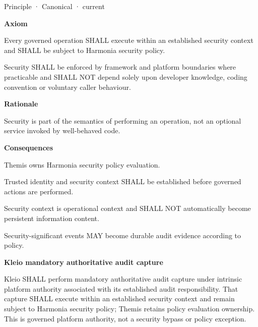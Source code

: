 \label{element:5de2ae2c3b794c2d9f3a14efd51d564f}
{\small Principle · Canonical · current}\par

\par\medskip\textbf{Axiom}\par


Every governed operation SHALL execute within an established security
context and SHALL be subject to Harmonia security policy.



Security SHALL be enforced by framework and platform boundaries where
practicable and SHALL NOT depend solely upon developer knowledge, coding
convention or voluntary caller behaviour.



\par\medskip\textbf{Rationale}\par


Security is part of the semantics of performing an operation, not an
optional service invoked by well-behaved code.



\par\medskip\textbf{Consequences}\par


Themis owns Harmonia security policy evaluation.



Trusted identity and security context SHALL be established before
governed actions are performed.



Security context is operational context and SHALL NOT automatically
become persistent information content.



Security-significant events MAY become durable audit evidence according
to policy.







\par\medskip\textbf{Kleio mandatory authoritative audit capture}\par


Kleio SHALL perform mandatory authoritative audit capture under intrinsic
platform authority associated with its established audit responsibility.
That capture SHALL execute within an established security context and remain
subject to Harmonia security policy; Themis retains policy evaluation ownership.
This is governed platform authority, not a security bypass or policy exception.



